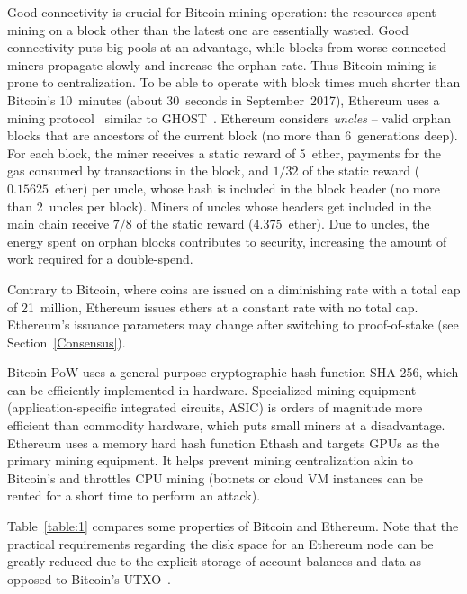 Good connectivity is crucial for Bitcoin mining operation: the resources spent mining on a block other than the latest one are essentially wasted.
Good connectivity puts big pools at an advantage, while blocks from worse connected miners propagate slowly and increase the orphan rate.
Thus Bitcoin mining is prone to centralization.
To be able to operate with block times much shorter than Bitcoin's 10~minutes (about 30~seconds in September~2017), Ethereum uses a mining protocol~\cite{EthdocsMining} similar to GHOST~\cite{Sompolinsky2013}.
Ethereum considers \emph{uncles} -- valid orphan blocks that are ancestors of the current block (no more than 6~generations deep).
For each block, the miner receives a static reward of 5~ether, payments for the gas consumed by transactions in the block, and $1/32$ of the static reward ($0.15625$~ether) per uncle, whose hash is included in the block header (no more than 2~uncles per block).
Miners of uncles whose headers get included in the main chain receive $7/8$ of the static reward ($4.375$~ether).
Due to uncles, the energy spent on orphan blocks contributes to security, increasing the amount of work required for a double-spend.

Contrary to Bitcoin, where coins are issued on a diminishing rate with a total cap of 21~million, Ethereum issues ethers at a constant rate with no total cap.
Ethereum's issuance parameters may change after switching to proof-of-stake (see Section~\ref{Consensus}).

Bitcoin PoW uses a general purpose cryptographic hash function SHA-256, which can be efficiently implemented in hardware.
Specialized mining equipment (application-specific integrated circuits, ASIC) is orders of magnitude more efficient than commodity hardware, which puts small miners at a disadvantage.
Ethereum uses a memory hard hash function Ethash and targets GPUs as the primary mining equipment.
It helps prevent mining centralization akin to Bitcoin's and throttles CPU mining (botnets or cloud VM instances can be rented for a short time to perform an attack).

Table~\ref{table:1} compares some properties of Bitcoin and Ethereum.
Note that the practical requirements regarding the disk space for an Ethereum node can be greatly reduced due to the explicit storage of account balances and data as opposed to Bitcoin's UTXO~\cite{EthereumSEDiskSpace}.

